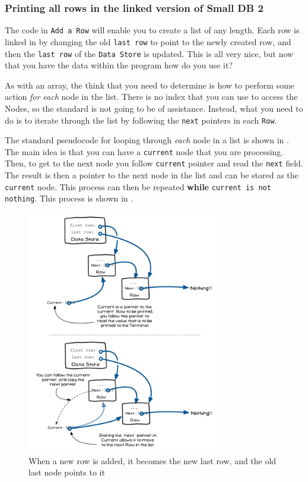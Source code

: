 
\clearpage
\subsubsection{Printing all rows in the linked version of Small DB 2} %
\label{ssub:printing_all_rows_in_the_linked_version_of_small_db_2}

The code in \texttt{Add a Row} will enable you to create a list of any length. Each row is linked in by changing the old \texttt{last row} to point to the newly created row, and then the \texttt{last row} of the \texttt{Data Store} is updated. This is all very nice, but now that you have the data within the program how do you use it?

As with an array, the think that you need to determine is how to perform some action \emph{for each} node in the list. There is no index that you can use to access the Nodes, so the standard  is not going to be of assistance. Instead, what you need to do is to iterate through the list by following the \texttt{next} pointers in each \texttt{Row}.

The standard pseudocode for looping through \emph{each} node in a list is shown in . The main idea is that you can have a \texttt{current} node that you are processing. Then, to get to the next node you follow \texttt{current} pointer and read the \texttt{next} field. The result is then a pointer to the next node in the list and can be stored as the \texttt{current} node. This process can then be repeated \textbf{while} \texttt{current is not nothing}. This process is shown in .

\begin{figure}[htbp]
   \centering
   \includegraphics[width=0.75\textwidth]{./topics/dynamic-memory/diagrams/IterateList} 
   \caption{When a new row is added, it becomes the new last row, and the old last node points to it}
   \label{fig:iterate-list}
\end{figure}


